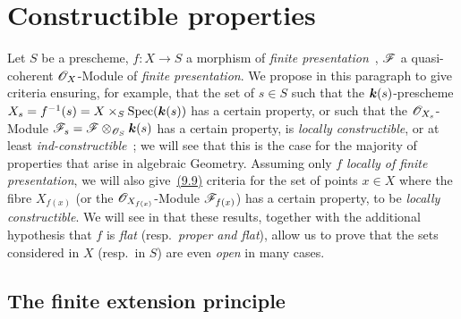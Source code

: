 \section{Constructible properties}
\label{section:IV.9}

Let $S$ be a prescheme, $f:X\to S$ a morphism of \emph{finite presentation}~,
$\mathscr{F}$ a quasi-coherent $\mathscr{O}_X$-Module of \emph{finite presentation}.
We propose in this paragraph to give criteria ensuring, for example, that the set of $s\in S$ such that the $\boldsymbol{k}(s)$-prescheme $X_s=f^{-1}(s)=X\times_S\operatorname{Spec}(\boldsymbol{k}(s))$ has a certain property, or such that the $\mathscr{O}_{X_s}$-Module $\mathscr{F}_s=\mathscr{F}\otimes_{\mathscr{O}_S}\boldsymbol{k}(s)$ has a certain property, is \emph{locally constructible}, or at least \emph{ind-constructible}~; we will see that this is the case for the majority of properties that arise in algebraic Geometry.
Assuming only $f$ \emph{locally of finite presentation}, we will also give~{\hyperref[IV.9.9]{(9.9)}} criteria for the set of points $x\in X$ where the fibre $X_{f(x)}$ (or the $\mathscr{O}_{X_{f(x)}}$-Module $\mathscr{F}_{f(x)}$) has a certain property, to be \emph{locally constructible}.
We will see in  that these results, together with the additional hypothesis that $f$ is \emph{flat} (resp.\ \emph{proper and flat}), allow us to prove that the sets considered in $X$ (resp.\ in $S$) are even \emph{open} in many cases.

\subsection{The finite extension principle}
\label{subsection:IV.9.1}

